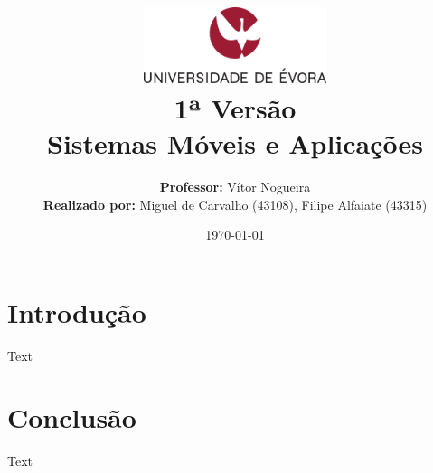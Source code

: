 \documentclass[11pt]{article}
\title
{
    \includegraphics[width=0.4\textwidth]{imgs/university.png}
    \\[0.1cm]
    \textbf{1ª Versão} \\
    Sistemas Móveis e Aplicações
}
\author
{
    \textbf{Professor:} Vítor Nogueira \\
    \textbf{Realizado por:} Miguel de Carvalho (43108), Filipe Alfaiate (43315)
}
\date{\today}
\begin{document}
\maketitle

\section{Introdução} 

\hspace{0,5cm}Text
\section{Conclusão}
\hspace{0,5cm}Text
\end{document}
